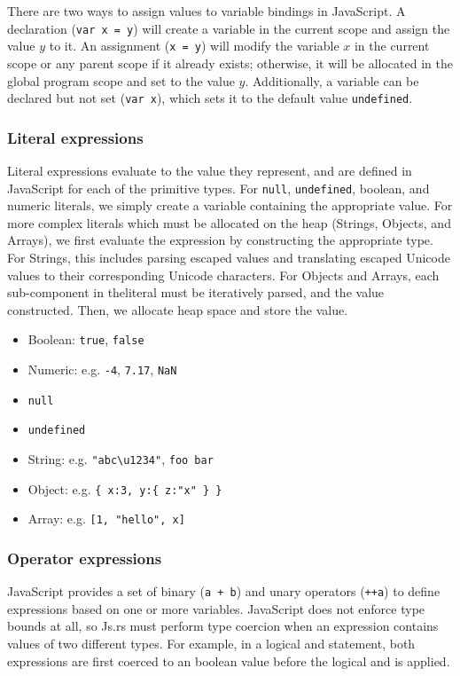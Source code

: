 \documentclass{article}
\begin{document}
\begin{multicols}{2}
There are two ways to assign values to variable bindings in JavaScript. A
declaration (\texttt{var x = y}) will create a variable in the current scope and
assign the value $y$ to it. An assignment (\texttt{x = y}) will modify the
variable $x$ in the current scope or any parent scope if it already exists;
otherwise, it will be allocated in the global program scope and set to the value
$y$. Additionally, a variable can be declared but not set (\texttt{var x}),
which sets it to the default value \texttt{undefined}.

\subsubsection*{Literal expressions}

Literal expressions evaluate to the value they represent, and are defined in
JavaScript for each of the primitive types. For \texttt{null},
\texttt{undefined}, boolean, and numeric literals, we simply create a variable
containing the appropriate value. For more complex literals which must be
allocated on the heap (Strings, Objects, and Arrays), we first evaluate the
expression by constructing the appropriate type. For Strings, this includes
parsing escaped values and translating escaped Unicode values to their
corresponding Unicode characters. For Objects and Arrays, each sub-component in
theliteral must be iteratively parsed, and the value constructed. Then, we
allocate heap space and store the value.

\begin{itemize}
  \item Boolean: \texttt{true}, \texttt{false}
  \item Numeric: e.g. \texttt{-4}, \texttt{7.17}, \texttt{NaN}
  \item \texttt{null}
  \item \texttt{undefined}
  \item String: e.g. \texttt{"abc\textbackslash u1234"},
    \texttt{\textquotesingle foo bar\textquotesingle}
  \item Object: e.g. \texttt{\{ x:3, y:\{ z:"x" \} \} }
  \item Array: e.g. \texttt{[1, "hello", x]}
\end{itemize}

\subsubsection*{Operator expressions}

JavaScript provides a set of binary (\texttt{a + b}) and unary operators
(\texttt{++a}) to define expressions based on one or more variables. JavaScript
does not enforce type bounds at all, so Js.rs must perform type coercion when an
expression contains values of two different types. For example, in a logical
and statement, both expressions are first coerced to an boolean value before the
logical and is applied.\newline


\end{multicols}
\end{document}
